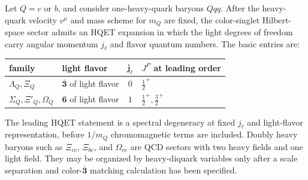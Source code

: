 \begin{definition}
\label{def:qcd-heavy-baryon-hqet-chart}
Let \(Q=c\) or \(b\), and consider one-heavy-quark baryons \(Qqq\).  After
the heavy-quark velocity \(v^\mu\) and mass scheme for \(m_Q\) are fixed,
the color-singlet Hilbert-space sector admits an HQET expansion in which the
light degrees of freedom carry angular momentum \(j_\ell\) and flavor
quantum numbers.  The basic entries are:
\begin{center}
\small
\begin{tabular}{p{}|p{}|c|p{}}
\textbf{family} & \textbf{light flavor} & \(\mathbf{j_\ell}\) &
\textbf{\(J^P\) at leading order}\\
\hline
\(\Lambda_Q,\Xi_Q\) & \(\overline{\mathbf 3}\) of light flavor &
\(0\) & \(\frac12^+\)\\
\(\Sigma_Q,\Xi'_Q,\Omega_Q\) & \(\mathbf 6\) of light flavor &
\(1\) & \(\frac12^+,\frac32^+\)
\end{tabular}
\end{center}
The leading HQET statement is a spectral degeneracy at fixed \(j_\ell\) and
light-flavor representation, before \(1/m_Q\) chromomagnetic terms are
included.  Doubly heavy baryons such as \(\Xi_{cc}\), \(\Xi_{bc}\), and
\(\Omega_{cc}\) are QCD sectors with two heavy fields and one light field.
They may be organized by heavy-diquark variables only after a scale
separation and color-\(\overline{\mathbf 3}\) matching calculation has been
specified.
\end{definition}

